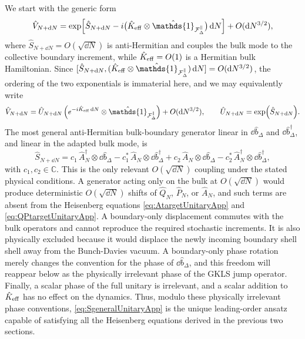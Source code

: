 \documentclass{article}
\def\cF{{\cal F}}
\newcommand{\openone}{\hat{\mathds{1}}}
\numberwithin{equation}{section}
\begin{document}
	We start with the generic form
	\begin{equation}
		\hat V_{N+\dd N} = \exp\!\left[ \hat S_{N+\dd N} - i\bigl(\hat K_{\rm eff}\otimes\openone_{\cF_\Delta^\parallel}\bigr)\,\dd N \right] + O(\dd N^{3/2}),
		\label{eq:VNdefUnitaryApp}
	\end{equation}
	where \(\hat S_{N+\dd N}=O(\sqrt{\dd N})\) is anti-Hermitian and couples the bulk mode to the collective boundary increment, while \(\hat K_{\rm eff}=O(1)\) is a Hermitian bulk Hamiltonian. Since \([\hat S_{N+\dd N},(\hat K_{\rm eff}\otimes\openone_{\cF_\Delta^\parallel})\,\dd N]=O(\dd N^{3/2})\), the ordering of the two exponentials is immaterial here, and we may equivalently write
	\begin{equation}
		\hat V_{N+\dd N} = \hat U_{N+\dd N} \left( e^{-i\hat K_{\rm eff}\,\dd N}\otimes\openone_{\cF_\Delta^\parallel} \right) + O(\dd N^{3/2}), \qquad \hat U_{N+\dd N} = \exp(\hat S_{N+\dd N}).
	\end{equation}
	The most general anti-Hermitian bulk-boundary generator linear in \(\dd\hat b_\Delta\) and \(\dd\hat b_\Delta^\dagger\), and linear in the adapted bulk mode, is
	\begin{equation}
		\hat S_{N+\dd N} = c_1\,\hat A_N^\dagger\otimes \dd\hat b_\Delta - c_1^*\,\hat A_N\otimes \dd\hat b_\Delta^\dagger + c_2\,\hat A_N\otimes \dd\hat b_\Delta - c_2^*\,\hat A_N^\dagger\otimes \dd\hat b_\Delta^\dagger,
		\label{eq:SgeneralUnitaryApp}
	\end{equation}
	with \(c_1,c_2\in\mathbb C\). This is the only relevant \(O(\sqrt{\dd N})\) coupling under the stated physical conditions. A generator acting only on the bulk at \(O(\sqrt{\dd N})\) would produce deterministic \(O(\sqrt{\dd N})\) shifts of \(\hat Q_N\), \(\hat P_N\), or \(\hat A_N\), and such terms are absent from the Heisenberg equations \cref{eq:AtargetUnitaryApp} and \cref{eq:QPtargetUnitaryApp}. A boundary-only displacement commutes with the bulk operators and cannot reproduce the required stochastic increments. It is also physically excluded because it would displace the newly incoming boundary shell shell away from the Bunch-Davies vacuum. A boundary-only phase rotation merely changes the convention for the phase of \(\dd\hat b_\Delta\), and this freedom will reappear below as the physically irrelevant phase of the GKLS jump operator. Finally, a scalar phase of the full unitary is irrelevant, and a scalar addition to \(\hat K_{\rm eff}\) has no effect on the dynamics. Thus, modulo these physically irrelevant phase conventions, \cref{eq:SgeneralUnitaryApp} is the unique leading-order ansatz capable of satisfying all the Heisenberg equations derived in the previous two sections.
\end{document}
